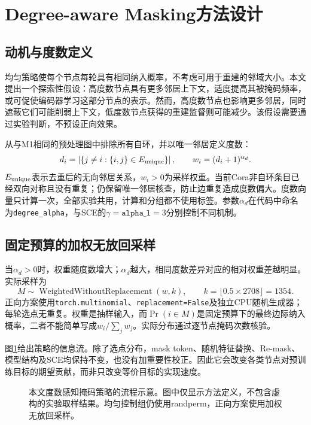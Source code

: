\section{Degree-aware Masking方法设计}\label{sec:degree-method}
\subsection{动机与度数定义}
均匀策略使每个节点每轮具有相同纳入概率，不考虑可用于重建的邻域大小。本文提出一个探索性假设：高度数节点具有更多邻居上下文，适度提高其被掩码频率，或可促使编码器学习这部分节点的表示。然而，高度数节点也影响更多邻居，同时遮蔽它们可能削弱上下文，低度数节点获得的重建监督则可能减少。该假设需要通过实验判断，不预设正向效果。

从与M1相同的预处理图中排除所有自环，并以唯一邻居定义度数：
\begin{equation}\label{eq:degree}
d_i=\left|\{j\ne i:\{i,j\}\in E_{\rm unique}\}\right|,
\qquad w_i=(d_i+1)^{\alpha_d}.
\end{equation}
$E_{\rm unique}$表示去重后的无向邻居关系，$w_i>0$为采样权重。当前Cora非自环条目已经双向对称且没有重复；仍保留唯一邻居核查，防止边重复造成度数偏大。度数向量只计算一次，全部实验共用，计算和分组都不使用标签。参数$\alpha_d$在代码中命名为\texttt{degree\_alpha}，与SCE的$\gamma=\texttt{alpha\_l}=3$分别控制不同机制。

\subsection{固定预算的加权无放回采样}
当$\alpha_d>0$时，权重随度数增大；$\alpha_d$越大，相同度数差异对应的相对权重差越明显。实际采样为
\begin{equation}\label{eq:weighted-mask}
M\sim\operatorname{WeightedWithoutReplacement}(w,k),\qquad
k=\lfloor0.5\times2708\rfloor=1354.
\end{equation}
正向方案使用\texttt{torch.multinomial}、\texttt{replacement=False}及独立CPU随机生成器；每轮选点无重复。权重是抽样输入，而$\Pr(i\in M)$是固定预算下的最终边际纳入概率，二者不能简单写成$w_i/\sum_jw_j$。实际分布通过逐节点掩码次数核验。

图\ref{fig:degree-flow}给出策略的信息流。除了选点分布，mask token、随机特征替换、Re-mask、模型结构及SCE均保持不变，也没有加重要性校正。因此它会改变各类节点对预训练目标的期望贡献，而非只改变等价目标的实现速度。
\begin{figure}[tbp]
\centering

\caption{本文度数感知掩码策略的流程示意。图中仅显示方法定义，不包含虚构的实验取样结果。均匀控制组仍使用randperm，正向方案使用加权无放回采样。}\label{fig:degree-flow}
\end{figure}

